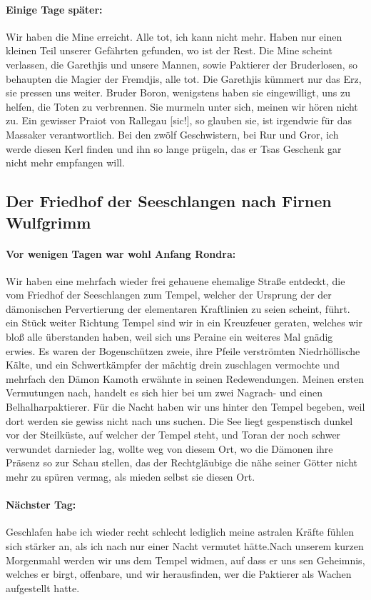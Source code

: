 \paragraph{Einige Tage später:}
Wir haben die Mine erreicht. Alle tot, ich kann nicht mehr. Haben nur einen kleinen Teil unserer Gefährten gefunden, wo ist der Rest. Die Mine scheint verlassen, die Garethjis und unsere Mannen, sowie Paktierer der Bruderlosen, so behaupten die Magier der Fremdjis, alle tot. Die Garethjis kümmert nur das Erz, sie pressen uns weiter. Bruder Boron, wenigstens haben sie eingewilligt, uns zu helfen, die Toten zu verbrennen.
Sie murmeln unter sich, meinen wir hören nicht zu. Ein gewisser Praiot von Rallegau [sic!], so glauben sie, ist irgendwie für das Massaker verantwortlich. Bei den zwölf Geschwistern, bei Rur und Gror, ich werde diesen Kerl finden und ihn so lange prügeln, das er Tsas Geschenk gar nicht mehr empfangen will.


\subsection{Der Friedhof der Seeschlangen nach Firnen Wulfgrimm}
\paragraph{Vor wenigen Tagen war wohl Anfang Rondra:}
Wir haben eine mehrfach wieder frei gehauene ehemalige Straße entdeckt, die vom Friedhof der Seeschlangen zum Tempel, welcher der Ursprung der der dämonischen Pervertierung der elementaren Kraftlinien zu seien scheint, führt. ein Stück weiter Richtung Tempel sind wir in ein Kreuzfeuer geraten, welches wir bloß alle überstanden haben, weil sich uns Peraine ein weiteres Mal gnädig erwies. Es waren der Bogenschützen zweie, ihre Pfeile verströmten Niedrhöllische Kälte, und ein Schwertkämpfer der mächtig drein zuschlagen vermochte und mehrfach den Dämon Kamoth erwähnte in seinen Redewendungen. Meinen ersten Vermutungen nach, handelt es sich hier bei um zwei Nagrach- und einen Belhalharpaktierer. Für die Nacht haben wir uns hinter den Tempel begeben, weil dort werden sie gewiss nicht nach uns suchen.
Die See liegt gespenstisch dunkel vor der Steilküste, auf welcher der Tempel steht, und Toran der noch schwer verwundet darnieder lag, wollte weg von diesem Ort, wo die Dämonen ihre Präsenz so zur Schau stellen, das der Rechtgläubige die nähe seiner Götter nicht mehr zu spüren vermag, als mieden selbst sie diesen Ort.

\paragraph{Nächster Tag:}
Geschlafen habe ich wieder recht schlecht lediglich meine astralen Kräfte fühlen sich stärker an, als ich nach nur einer Nacht vermutet hätte.Nach unserem kurzen Morgenmahl werden wir uns dem Tempel widmen, auf dass er uns sen Geheimnis, welches er birgt, offenbare, und wir herausfinden, wer die Paktierer als Wachen aufgestellt hatte.

